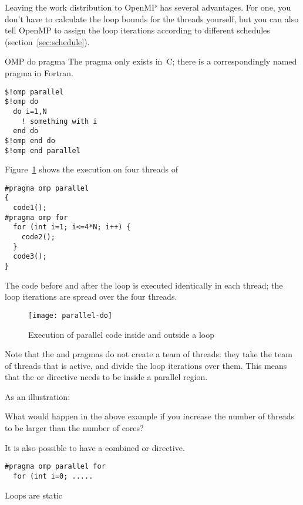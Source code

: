 Leaving the work distribution to OpenMP has several advantages.
For one, you don't have to calculate the loop bounds
for the threads yourself, but you can also tell OpenMP to assign the loop
iterations according to different schedules (section~\ref{sec:schedule}).

\begin{fortrannote}{OMP do pragma}
  The  pragma only exists in~C;
  there is a correspondingly named  pragma in Fortran.
\begin{lstlisting}
$!omp parallel
$!omp do
  do i=1,N
    ! something with i
  end do
$!omp end do
$!omp end parallel
\end{lstlisting}
\end{fortrannote}

Figure~\ref{fig:omp-par-do} shows the execution on four threads of
\begin{lstlisting}
#pragma omp parallel
{
  code1();
#pragma omp for
  for (int i=1; i<=4*N; i++) {
    code2();
  }
  code3();
}
\end{lstlisting}
The code before and after the loop is executed identically
in each thread; the loop iterations are spread over the four threads.
\begin{figure}[ht]
  \texttt{[image: parallel-do]}
  \caption{Execution of parallel code inside and outside a loop}
  \label{fig:omp-par-do}
\end{figure}

Note that the  and 
pragmas do not create a team of threads: they
take the team of threads that is active,
and divide the loop iterations over them.
This means that the  or  directive needs to be
inside a parallel region.

As an illustration:

\begin{exercise}
  What would happen in the above example if you increase the number of threads
  to be larger than the number of cores?
\end{exercise}

It is also possible to have a combined
 or  directive.
\begin{lstlisting}
#pragma omp parallel for
  for (int i=0; .....
\end{lstlisting}

 {Loops are static}

